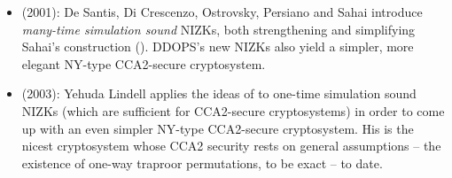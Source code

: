 \begin{itemize}
\item \cite{desantis:robustnizk} (2001): De Santis, Di Crescenzo, Ostrovsky,
Persiano and Sahai introduce \emph{many-time simulation sound} NIZKs, 
both strengthening and simplifying Sahai's construction (\cite{sahai:nizkcca}). DDOPS's new NIZKs also
yield a simpler, more elegant NY-type CCA2-secure cryptosystem.

\item \cite{lindell:simplercca2} (2003): Yehuda Lindell applies the ideas
of \cite{desantis:robustnizk} to one-time simulation sound NIZKs (which are
sufficient for CCA2-secure cryptosystems) in order to come up with an
even simpler NY-type CCA2-secure cryptosystem. His is the nicest cryptosystem
whose CCA2 security rests on general assumptions -- the existence of one-way
traproor permutations, to be exact -- to date.
\end{itemize}

